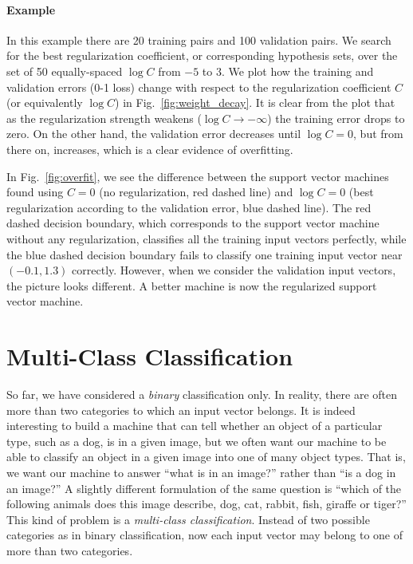 \documentclass{report}
\begin{document}
\paragraph{Example} 

In this example there are 20 training pairs and 100 validation pairs. We search
for the best regularization coefficient, or corresponding hypothesis sets, over
the set of 50 equally-spaced $\log C$ from $-5$ to $3$. We plot how the training
and validation errors (0-1 loss) change with respect to the regularization
coefficient $C$ (or equivalently $\log C$) in Fig.~\ref{fig:weight_decay}. It is
clear from the plot that as the regularization strength weakens ($\log C \to
-\infty$) the training error drops to zero. On the other hand, the validation
error decreases until $\log C = 0$, but from there on, increases, which is a
clear evidence of overfitting. 

In Fig.~\ref{fig:overfit}, we see the difference between the support vector
machines found using $C=0$ (no regularization, red dashed line) and $\log C=0$
(best regularization according to the validation error, blue dashed line). The
red dashed decision boundary, which corresponds to the support vector machine
without any regularization, classifies all the training input vectors perfectly,
while the blue dashed decision boundary fails to classify one training input
vector near $(-0.1, 1.3)$ correctly. However, when we consider the validation
input vectors, the picture looks different. A better machine is now the
regularized support vector machine. 

\section{Multi-Class Classification}

So far, we have considered a {\it binary} classification only. In reality, there
are often more than two categories to which an input vector belongs.  It is
indeed interesting to build a machine that can tell whether an object of a
particular type, such as a dog, is in a given image, but we often want our
machine to be able to classify an object in a given image into one of many
object types. That is, we want our machine to answer ``what is in an image?''
rather than ``is a dog in an image?'' A slightly different formulation of the
same question is ``which of the following animals does this image describe, dog,
cat, rabbit, fish, giraffe or tiger?'' This kind of problem is a {\it
multi-class classification}. Instead of two possible categories as in binary
classification, now each input vector may belong to one of more than two
categories. 
\end{document}
